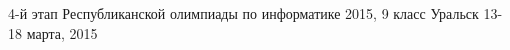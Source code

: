 \documentclass [11pt, a4paper, oneside] {article}
\begin{document}
\contest
{4-й этап Республиканской олимпиады по информатике 2015, 9 класс}%
{Уральск}%
{13-18 марта, 2015}%


\renewcommand{\t}{\texttt}
\end{document}
